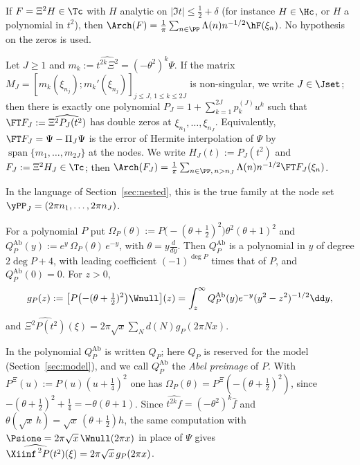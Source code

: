 \begin{fact}\label{cor:zerokilling}
If $F=\Xi^2H\in\Tc$ with $H$ analytic on $\lvert\Im t\rvert\le\frac12+\delta$ (for instance $H\in\Hc$, or $H$ a polynomial in
$t^2$), then $\Arch(F)=\frac1\pi\sum_{n\in\PP}\Lambda(n)n^{-1/2}\hF(\xi_n)$. No hypothesis on the zeros is used.
\end{fact}

\begin{fact}\label{prop:E}
Let $J\ge1$ and $m_k:=\widehat{t^{2k}\Xi^2}=(-\theta^2)^k\Psi$. If the matrix
$M_J=[m_k(\xi_{n_j});m_k'(\xi_{n_j})]_{j\le J,\,1\le k\le2J}$ is non-singular, we write $J\in\Jset$; then there is exactly one polynomial
$P_J=1+\sum_{k=1}^{2J}p_k^{(J)}u^k$ such that $\FT F_J:=\widehat{\Xi^2P_J(t^2)}$ has double zeros at $\xi_{n_1},\dots,\xi_{n_J}$. Equivalently,
$\FT F_J=\Psi-\Pi_J\Psi$ is the error of Hermite interpolation of $\Psi$ by $\operatorname{span}\{m_1,\dots,m_{2J}\}$ at the nodes. We
write $H_J(t):=P_J(t^2)$ and $F_J:=\Xi^2H_J\in\Tc$; then $\Arch(F_J)=\frac1\pi\sum_{n\in\PP,\,n>n_J}\Lambda(n)n^{-1/2}\FT F_J(\xi_n)$.
\end{fact}

In the language of Section~\ref{sec:nested}, this is the true family at the node set $\yPP_J=(2\pi n_1,\dots,2\pi n_J)$.

\begin{fact}\label{lem:abel}
For a polynomial $P$ put $\Omega_P(\theta):=P\bigl(-(\theta+\tfrac12)^2\bigr)\theta^2(\theta+1)^2$ and
$Q^{\mathrm{Ab}}_P(y):=e^{y}\,\Omega_P(\theta)\,e^{-y}$, with $\theta=y\frac{d}{dy}$. Then $Q^{\mathrm{Ab}}_P$ is a polynomial in $y$ of degree
$2\deg P+4$, with leading coefficient $(-1)^{\deg P}$ times that of $P$, and $Q^{\mathrm{Ab}}_P(0)=0$. For $z>0$,
\[
g_P(z):=\bigl[P\bigl(-(\theta+\tfrac12)^2\bigr)\Wnull\bigr](z)=\int_z^\infty Q^{\mathrm{Ab}}_P(y)e^{-y}(y^2-z^2)^{-1/2}\dd y,
\]
and $\widehat{\Xi^2P(t^2)}(\xi)=2\pi\sqrt x\sum_Nd(N)g_P(2\pi Nx)$.
\end{fact}

In \cite{PaperI} the polynomial $Q^{\mathrm{Ab}}_P$ is written $Q_P$; here $Q_P$ is reserved for the model
(Section~\ref{sec:model}), and we call $Q^{\mathrm{Ab}}_P$ the \emph{Abel preimage} of $P$. With $P^{\Xi}(u):=P(u)(u+\frac14)^2$ one has
$\Omega_P(\theta)=P^{\Xi}(-(\theta+\frac12)^2)$, since $-(\theta+\frac12)^2+\frac14=-\theta(\theta+1)$. Since $\widehat{t^{2k}f}=(-\theta^2)^k\hat f$ and
$\theta(\sqrt x\,h)=\sqrt x\,(\theta+\frac12)h$, the same computation with $\Psione=2\pi\sqrt x\,\Wnull(2\pi x)$ in place of $\Psi$ gives
$\widehat{\Xiinf^{\,2}P(t^2)}(\xi)=2\pi\sqrt x\,g_P(2\pi x)$.

